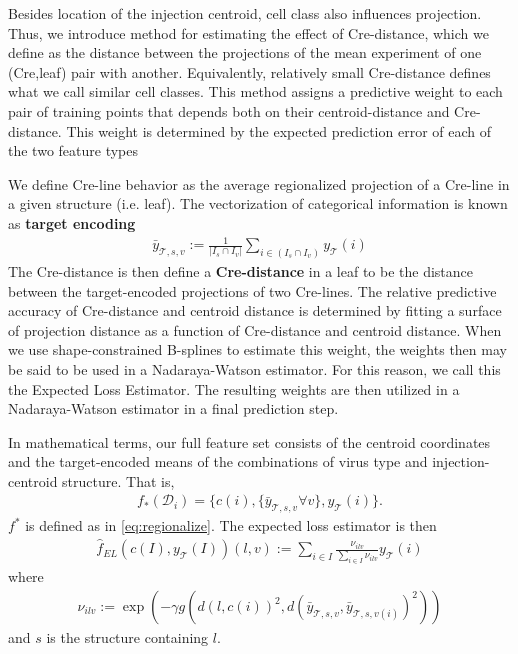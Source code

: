 \label{supp_sec:el}

Besides location of the injection centroid, cell class also influences projection.
Thus, we introduce method for estimating the effect of Cre-distance, which we define as the distance between the projections of the mean experiment of one (Cre,leaf) pair with another.
Equivalently, relatively small Cre-distance defines what we call similar cell classes.
This method assigns a predictive weight to each pair of training points that depends both on their centroid-distance and Cre-distance.
This weight is determined by the expected prediction error of each of the two feature types

We define Cre-line behavior as the average regionalized projection of a Cre-line in a given structure (i.e. leaf).
The vectorization of categorical information is known as \textbf{target encoding} 
\begin{eqnarray*}
\bar y_{\mathcal T,s,v} := \frac{1}{|I_s \cap I_v|}  \sum_{i \in (I_s \cap I_v)} y_{\mathcal T}(i)
\end{eqnarray*}
The Cre-distance is then define a \textbf{Cre-distance} in a leaf to be the distance between the target-encoded projections of two Cre-lines.
The relative predictive accuracy of Cre-distance and centroid distance is determined by fitting a surface of projection distance as a function of Cre-distance and centroid distance. 
When we use shape-constrained B-splines to estimate this weight, the weights then may be said to be used in a Nadaraya-Watson estimator.
For this reason, we call this the Expected Loss Estimator.
The resulting weights are then utilized in a Nadaraya-Watson estimator in a final prediction step.

In mathematical terms, our full feature set consists of the centroid coordinates and the target-encoded means of the combinations of virus type and injection-centroid structure.
That is, 
\begin{eqnarray*}
f_*({\mathcal D}_i) = \{c(i) , \{\bar y_{\mathcal T,s,v}  \forall v \}, y_{\mathcal T}(i) \}.
\end{eqnarray*}
$f^*$ is defined as in \eqref{eq:regionalize}.
The expected loss estimator is then 
\begin{eqnarray*}
\hat f_{EL} ( c(I),y_{\mathcal T} (I))(l,v) :=  \sum_{i \in I} \frac{ \nu_{ilv} }{\sum_{i \in I}  \nu_{ilv}  } y_{\mathcal T}(i)
\end{eqnarray*}
where
\begin{eqnarray*}
\nu_{ilv} := \exp (- \gamma g( d(l, c(i))^2, d(\bar y_{\mathcal T,s,v} , \bar y_{\mathcal T,s,v(i)}  )^2))
\end{eqnarray*}
and $s$ is the structure containing $l$.

